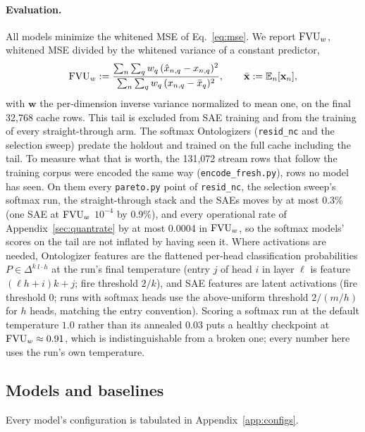 \paragraph{Evaluation.}
All models minimize the whitened MSE of Eq.~\eqref{eq:mse}. We report
$\mathrm{FVU}_w$, whitened MSE divided by the whitened variance of a constant
predictor,
\begin{equation}
	\mathrm{FVU}_w := \frac{\sum_{n} \sum_{q} w_q \,(\hat{x}_{n,q} - x_{n,q})^2}
	              {\sum_{n} \sum_{q} w_q \,(x_{n,q} - \bar{x}_q)^2},
	\qquad \bar{\mathbf{x}} := \mathbb{E}_n[\mathbf{x}_n],
	\label{eq:fvu}
\end{equation}
with $\mathbf{w}$ the per-dimension inverse variance normalized to mean
one, on the final 32{,}768 cache rows. This tail is excluded from
SAE training and from the training of every straight-through arm.
The softmax Ontologizers (\texttt{resid\_nc} and the selection sweep)
predate the holdout and trained on the full cache including the tail. To
measure what that is worth, the 131{,}072 stream rows that follow the
training corpus were encoded the same way (\texttt{encode\_fresh.py}),
rows no model has seen. On them every \texttt{pareto.py} point of
\texttt{resid\_nc}, the selection sweep's softmax run, the
straight-through stack and the SAEs moves by at most 0.3\% (one SAE at
$\mathrm{FVU}_w$ $10^{-4}$ by 0.9\%), and every operational rate of
Appendix~\ref{sec:quantrate} by at most 0.0004 in $\mathrm{FVU}_w$, so the softmax
models' scores on the tail are not inflated by having seen it. Where activations are needed, Ontologizer
features are the flattened per-head classification probabilities
$P \in \Delta^{k}{}^{\,l\cdot h}$ at the run's final temperature (entry
$j$ of head $i$ in layer $\ell$ is feature $(\ell h + i)k + j$; fire
threshold $2/k$), and SAE features are latent activations (fire threshold
$0$; runs with softmax heads use the above-uniform threshold $2/(m/h)$ for
$h$ heads, matching the entry convention). Scoring a
softmax run at the default temperature $1.0$ rather than its annealed
$0.03$ puts a healthy checkpoint at $\mathrm{FVU}_w \approx 0.91$, which is
indistinguishable from a broken one; every number here uses the run's own
temperature.

\subsection{Models and baselines}
\label{sec:models}

Every model's configuration is tabulated in Appendix~\ref{app:configs}.

